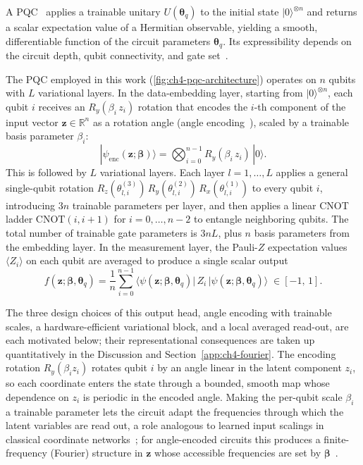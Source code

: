 A PQC~\cite{Benedetti_2019} applies a trainable unitary $U(\boldsymbol{\theta}_q)$ to the initial state $|0\rangle^{\otimes n}$ and returns a scalar expectation value of a Hermitian observable, yielding a smooth, differentiable function of the circuit parameters $\boldsymbol{\theta}_q$. Its expressibility depends on the circuit depth, qubit connectivity, and gate set~\cite{sim2019expressibility}.

The PQC employed in this work (\ref{fig:ch4-pqc-architecture}) operates on $n$ qubits with $L$ variational layers. In the data-embedding layer, starting from $|0\rangle^{\otimes n}$, each qubit $i$ receives an $R_y(\beta_i\, z_i)$ rotation that encodes the $i$-th component of the input vector $\mathbf{z} \in \mathbb{R}^n$ as a rotation angle (angle encoding~\cite{schuld2021machine}), scaled by a trainable basis parameter $\beta_i$:
\begin{equation}
  |\psi_\mathrm{enc}(\mathbf{z};\boldsymbol{\beta})\rangle = \bigotimes_{i=0}^{n-1} R_y(\beta_i\, z_i)\,|0\rangle.
\end{equation}
This is followed by $L$ variational layers. Each layer $l = 1, \ldots, L$ applies a general single-qubit rotation $R_z(\theta^{(3)}_{l,i})\, R_y(\theta^{(2)}_{l,i})\, R_x(\theta^{(1)}_{l,i})$ to every qubit $i$, introducing $3n$ trainable parameters per layer, and then applies a linear CNOT ladder $\text{CNOT}(i, i{+}1)$ for $i = 0, \ldots, n{-}2$ to entangle neighboring qubits. The total number of trainable gate parameters is $3nL$, plus $n$ basis parameters from the embedding layer. In the measurement layer, the Pauli-$Z$ expectation values $\langle Z_i \rangle$ on each qubit are averaged to produce a single scalar output
\begin{equation}
  f(\mathbf{z}; \boldsymbol{\beta}, \boldsymbol{\theta}_q)
  = \frac{1}{n} \sum_{i=0}^{n-1} \langle\psi(\mathbf{z}; \boldsymbol{\beta}, \boldsymbol{\theta}_q)|\, Z_i \,|\psi(\mathbf{z}; \boldsymbol{\beta}, \boldsymbol{\theta}_q)\rangle
  \;\in [-1,\, 1].
  \label{eq:ch4-pqc-output}
\end{equation}

The three design choices of this output head, angle encoding with trainable scales, a hardware-efficient variational block, and a local averaged read-out, are each motivated below; their representational consequences are taken up quantitatively in the Discussion and Section~\ref{app:ch4-fourier}. The encoding rotation $R_y(\beta_i z_i)$ rotates qubit $i$ by an angle linear in the latent component $z_i$, so each coordinate enters the state through a bounded, smooth map whose dependence on $z_i$ is periodic in the encoded angle. Making the per-qubit scale $\beta_i$ a trainable parameter lets the circuit adapt the frequencies through which the latent variables are read out, a role analogous to learned input scalings in classical coordinate networks~\cite{schuld2021machine}; for angle-encoded circuits this produces a finite-frequency (Fourier) structure in $\mathbf{z}$ whose accessible frequencies are set by $\boldsymbol{\beta}$~\cite{schuld2021effect}.

